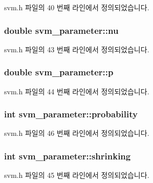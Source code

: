 svm.\+h 파일의 40 번째 라인에서 정의되었습니다.

\hypertarget{structsvm__parameter_a4c20c566cb61d5808e8cabd7adbc35c1}{
\subsubsection[{nu}]{\setlength{\rightskip}{0pt plus 5cm}double svm\+\_\+parameter\+::nu}}\label{structsvm__parameter_a4c20c566cb61d5808e8cabd7adbc35c1}


svm.\+h 파일의 43 번째 라인에서 정의되었습니다.

\hypertarget{structsvm__parameter_a3b60d7ce96137a64caca81095d1a188b}{
\subsubsection[{p}]{\setlength{\rightskip}{0pt plus 5cm}double svm\+\_\+parameter\+::p}}\label{structsvm__parameter_a3b60d7ce96137a64caca81095d1a188b}


svm.\+h 파일의 44 번째 라인에서 정의되었습니다.

\hypertarget{structsvm__parameter_afac0ef02879d7e27e17ac2a75115a7d9}{
\subsubsection[{probability}]{\setlength{\rightskip}{0pt plus 5cm}int svm\+\_\+parameter\+::probability}}\label{structsvm__parameter_afac0ef02879d7e27e17ac2a75115a7d9}


svm.\+h 파일의 46 번째 라인에서 정의되었습니다.

\hypertarget{structsvm__parameter_afdbccdf6a24be650d75804b783edc347}{
\subsubsection[{shrinking}]{\setlength{\rightskip}{0pt plus 5cm}int svm\+\_\+parameter\+::shrinking}}\label{structsvm__parameter_afdbccdf6a24be650d75804b783edc347}


svm.\+h 파일의 45 번째 라인에서 정의되었습니다.

